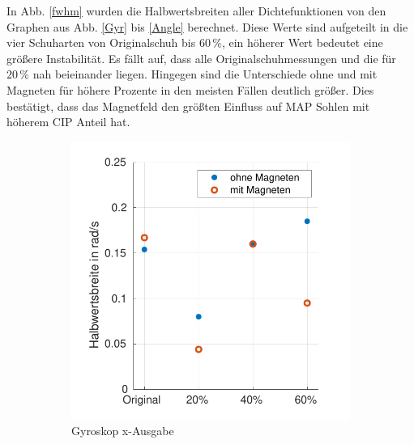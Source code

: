 In Abb. \ref{fwhm} wurden die Halbwertsbreiten aller Dichtefunktionen von den Graphen aus Abb. \ref{Gyr} bis \ref{Angle} berechnet. Diese Werte sind aufgeteilt in die vier Schuharten von Originalschuh bis $60\,\%$, ein höherer Wert bedeutet eine größere Instabilität. Es fällt auf, dass alle Originalschuhmessungen und die für $20\,\%$ nah beieinander liegen. Hingegen sind die Unterschiede ohne und mit Magneten für höhere Prozente in den meisten Fällen deutlich größer. Dies bestätigt, dass das Magnetfeld den größten Einfluss auf MAP Sohlen mit höherem CIP Anteil hat. 
\begin{figure}[tb!]
	\centering
	\begin{adjustwidth}{-0.1\linewidth}{-0.1\linewidth}
		\begin{subfigure}[c]{.32\linewidth}
			\centering
			\includegraphics[width=\linewidth]{Bilder/fwhm_GyrX.pdf}
			\caption{Gyroskop x-Ausgabe}
			\vspace{5pt}
		\end{subfigure}
		\hfill
		\begin{subfigure}[c]{.32\linewidth}
			\centering

\end{subfigure}
\end{adjustwidth}
\end{figure}
